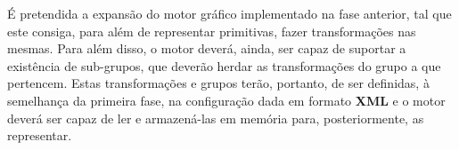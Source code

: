 \noindent
É pretendida a expansão do motor gráfico implementado na
fase anterior, tal que este consiga, para além de
representar primitivas, fazer transformações nas mesmas.
\newline
\break
\noindent
Para além disso, o motor deverá, ainda, ser capaz de
suportar a existência de sub-grupos, que deverão herdar as
transformações do grupo a que pertencem.
\newline
\break
\noindent
Estas transformações e grupos terão, portanto, de ser
definidas, à semelhança da primeira fase, na configuração
dada em formato \textbf{XML} e o motor deverá ser capaz
de ler e armazená-las em memória para,
posteriormente, as representar.
